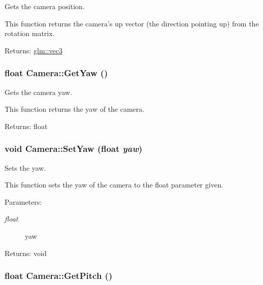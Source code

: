 Gets the camera position. 

This function returns the camera's up vector (the direction pointing up) from the rotation matrix.

\begin{Desc}
\item[Returns:]\hyperlink{group__core__types_g1c47e8b3386109bc992b6c48e91b0be7}{glm::vec3} \end{Desc}
\hypertarget{class_camera_6318f73a8c7364eb477b7b5aa0ee930e}{
\subsubsection[GetYaw]{\setlength{\rightskip}{0pt plus 5cm}float Camera::GetYaw ()}}
\label{class_camera_6318f73a8c7364eb477b7b5aa0ee930e}


Gets the camera yaw. 

This function returns the yaw of the camera.

\begin{Desc}
\item[Returns:]float \end{Desc}
\hypertarget{class_camera_0f3853ee0b4a1c1fcf3c136decbbe056}{
\subsubsection[SetYaw]{\setlength{\rightskip}{0pt plus 5cm}void Camera::SetYaw (float {\em yaw})}}
\label{class_camera_0f3853ee0b4a1c1fcf3c136decbbe056}


Sets the yaw. 

This function sets the yaw of the camera to the float parameter given.

\begin{Desc}
\item[Parameters:]
\begin{description}
\item[{\em float}]yaw \end{description}
\end{Desc}
\begin{Desc}
\item[Returns:]void \end{Desc}
\hypertarget{class_camera_498895884e11402ffaf248c32aa31856}{
\subsubsection[GetPitch]{\setlength{\rightskip}{0pt plus 5cm}float Camera::GetPitch ()}}
\label{class_camera_498895884e11402ffaf248c32aa31856}


